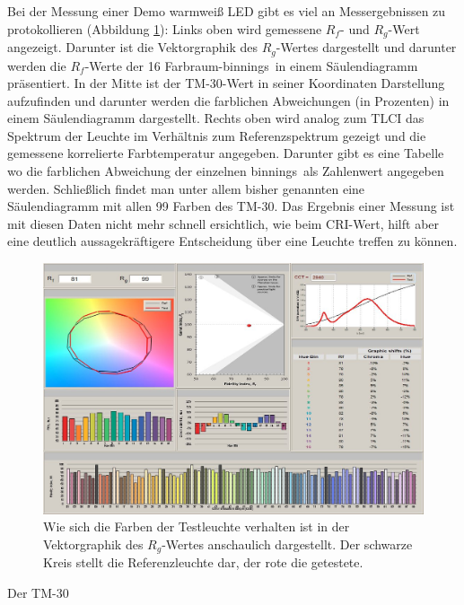 Bei der Messung einer Demo warmweiß LED gibt es viel an Messergebnissen zu protokollieren (Abbildung \ref{b_tm304}): Links oben wird gemessene $R_{f}$- und $R_{g}$-Wert angezeigt. Darunter ist die Vektorgraphik des $R_{g}$-Wertes dargestellt und darunter werden die $R_{f}$-Werte der 16 Farbraum-\glqq binnings\grqq\  in einem Säulendiagramm präsentiert. In der Mitte ist der TM-30-Wert in seiner Koordinaten Darstellung aufzufinden und darunter werden die farblichen Abweichungen (in Prozenten) in einem Säulendiagramm dargestellt. Rechts oben wird analog zum TLCI das Spektrum der Leuchte im Verhältnis zum Referenzspektrum gezeigt und die gemessene korrelierte Farbtemperatur angegeben. Darunter gibt es eine Tabelle wo die farblichen Abweichung der einzelnen \glqq binnings\grqq\ als Zahlenwert angegeben werden. Schließlich findet man unter allem bisher genannten eine Säulendiagramm mit allen 99 Farben des TM-30. 
Das Ergebnis einer Messung ist mit diesen Daten nicht mehr schnell ersichtlich, wie beim CRI-Wert, hilft aber eine deutlich aussagekräftigere Entscheidung über eine Leuchte treffen zu können. 

\begin{figure}[H]     %
\centering
\includegraphics[width=1.0\textwidth]{bilder/tm304} 
\caption {Wie sich die Farben der Testleuchte verhalten ist in der Vektorgraphik des $R_{g}$-Wertes anschaulich dargestellt. Der schwarze Kreis stellt die Referenzleuchte dar, der rote die getestete.\protect\footnotemark}\label{b_tm304}
\end{figure}

Der TM-30 


